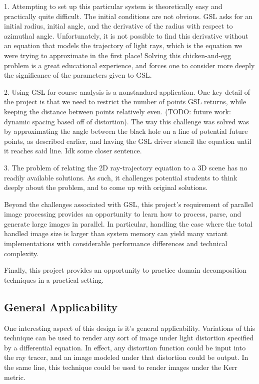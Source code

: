 1. Attempting to set up this particular system is theoretically easy and practically quite difficult. The initial conditions are not obvious. GSL asks for an initial radius, initial angle, and the derivative of the radius with respect to azimuthal angle. Unfortunately, it is not possible to find this derivative without an equation that models the trajectory of light rays, which is the equation we were trying to approximate in the first place! Solving this chicken-and-egg problem is a great educational experience, and forces one to consider more deeply the significance of the parameters given to GSL. 

2. Using GSL for course analysis is a nonstandard application. One key detail of the project is that we need to restrict the number of points GSL returns, while keeping the distance between points relatively even. (TODO: future work: dynamic spacing based off of distortion). The way this challenge was solved was by approximating the angle between the black hole on a line of potential future points, as described earlier, and having the GSL driver stencil the equation until it reaches said line. Idk some closer sentence.

3. The problem of relating the 2D ray-trajectory equation to a 3D scene has no readily available solutions. As such, it challenges potential students to think deeply about the problem, and to come up with original solutions.

Beyond the challenges associated with GSL, this project's requirement of parallel image processing provides an opportunity to learn how to process, parse, and generate large images in parallel. In particular, handling the case where the total handled image size is larger than system memory can yield many variant implementations with considerable performance differences and technical complexity. 

Finally, this project provides an opportunity to practice domain decomposition techniques in a practical setting. %

\subsection {General Applicability}

One interesting aspect of this design is it's general applicability. Variations of this technique can be used to render any sort of image under light distortion specified by a differential equation. In effect, any distortion function could be input into the ray tracer, and an image modeled under that distortion could be output. In the same line, this technique could be used to render images under the Kerr metric.
